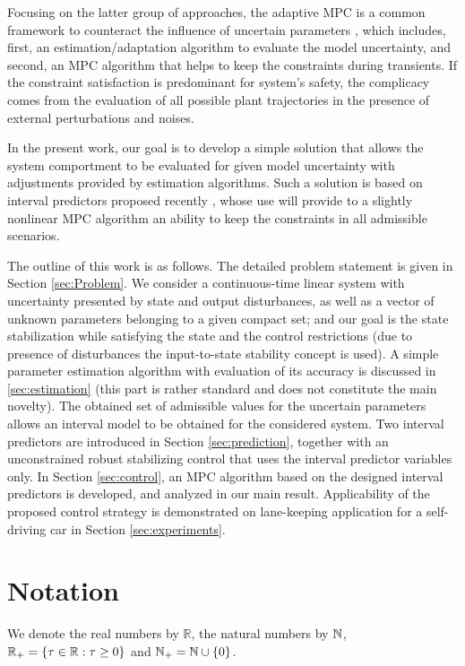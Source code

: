 \documentclass[letterpaper, 10 pt, conference]{ieeeconf}  %
\begin{document}
Focusing on the latter group of approaches, the adaptive MPC is a
common framework to counteract the influence of uncertain parameters
\cite{Fukushima2007,Adetola2009,Adetola2011,Aswani2013,Vicente2019},
which includes, first, an estimation/adaptation algorithm to evaluate
the model uncertainty, and second, an MPC algorithm that helps to
keep the constraints during transients. If the constraint satisfaction
is predominant for system's safety, the complicacy comes from the
evaluation of all possible plant trajectories in the presence of external
perturbations and noises. 

In the present work, our goal is to develop a simple solution that
allows the system comportment to be evaluated for given model uncertainty
with adjustments provided by estimation algorithms. Such a solution
is based on interval predictors proposed recently \cite{Efimov2012,leurent2019interval},
whose use will provide to a slightly nonlinear MPC algorithm an ability
to keep the constraints in all admissible scenarios.

The outline of this work is as follows. The detailed problem statement
is given in Section \ref{sec:Problem}. We consider a continuous-time
linear system with uncertainty presented by state and output disturbances,
as well as a vector of unknown parameters belonging to a given compact
set; and our goal is the state stabilization while satisfying the
state and the control restrictions (due to presence of disturbances
the input-to-state stability concept is used). A simple parameter
estimation algorithm with evaluation of its accuracy is discussed
in \ref{sec:estimation} (this part is rather standard and does
not constitute the main novelty). The obtained set of admissible values
for the uncertain parameters allows an interval model to be obtained
for the considered system. Two interval predictors are introduced
in Section \ref{sec:prediction}, together with an unconstrained robust
stabilizing control that uses the interval predictor variables only.
In Section \ref{sec:control}, an MPC algorithm based on the designed interval predictors is developed, and analyzed in our main result. Applicability
of the proposed control strategy is demonstrated on lane-keeping application for a self-driving car in Section \ref{sec:experiments}.

\section*{Notation}

We denote the real numbers  by $\mathbb{R}$, the natural numbers
by $\mathbb{N}$, $\mathbb{R}_{+}=\{\tau\in\mathbb{R}:\tau\ge0\}$ and $\mathbb{N}_{+}=\mathbb{N}\cup\{0\}$. 
\end{document}

